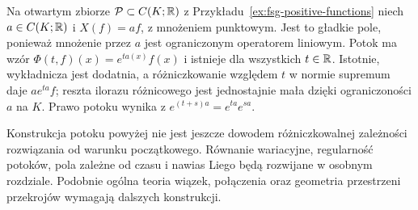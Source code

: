 \begin{przyklad}
\label{ex:fsg-function-flow}
Na otwartym zbiorze $\mathcal P\subset C(K;\mathbb R)$
z Przykładu~\ref{ex:fsg-positive-functions} niech
$a\in C(K;\mathbb R)$ i $X(f)=af$, z mnożeniem punktowym.
Jest to gładkie pole, ponieważ mnożenie przez $a$
jest ograniczonym operatorem liniowym.
Potok ma wzór $\Phi(t,f)(x)=e^{ta(x)}f(x)$ i istnieje
dla wszystkich $t\in\mathbb R$. Istotnie, wykładnicza
jest dodatnia, a różniczkowanie względem $t$ w normie
supremum daje $a e^{ta}f$; reszta ilorazu różnicowego
jest jednostajnie mała dzięki ograniczoności $a$ na $K$.
Prawo potoku wynika z $e^{(t+s)a}=e^{ta}e^{sa}$.
\end{przyklad}

\begin{uwaga}
\label{rem:fsg-next-flow}
Konstrukcja potoku powyżej nie jest jeszcze dowodem
różniczkowalnej zależności rozwiązania od warunku
początkowego. Równanie wariacyjne, regularność potoków,
pola zależne od czasu i nawias Liego będą rozwijane
w osobnym rozdziale. Podobnie ogólna teoria wiązek,
połączenia oraz geometria przestrzeni przekrojów
wymagają dalszych konstrukcji.
\end{uwaga}
